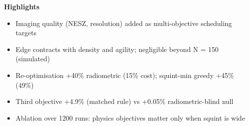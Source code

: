 \documentclass{article}
\begin{document}
\noindent\textbf{Highlights}

\begin{itemize}[leftmargin=*, nosep]

\item Imaging quality (NESZ, resolution) added as multi-objective scheduling targets

\item Edge contracts with density and agility; negligible beyond N = 150 (simulated)

\item Re-optimisation +40\% radiometric (15\% cost); squint-min greedy +45\% (49\%)

\item Third objective +4.9\% (matched rule) vs +0.05\% radiometric-blind null

\item Ablation over 1200 runs: physics objectives matter only when squint is wide

\end{itemize}
\end{document}
